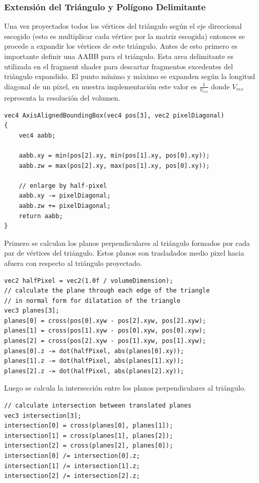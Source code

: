 \subsubsection{Extensión del Triángulo y Polígono Delimitante}
Una vez proyectados todos los vértices del triángulo según el eje direccional escogido (esto es multiplicar cada vértice por la matriz escogida) entonces se procede a expandir los vértices de este triángulo. Antes de esto primero es importante definir una \ac{AABB} para el triángulo. Esta area delimitante es utilizada en el fragment shader para descartar fragmentos excedentes del triángulo expandido. El punto mínimo y máximo se expanden según la longitud diagonal de un pixel, en nuestra implementación este valor es $\frac{1}{V_{res}}$ donde $V_{res}$ representa la resolución del volumen.
\\
\begin{lstlisting}[caption={Creación de un \ac{AABB} para el triángulo proyectado.}, label=AxisAlignedBoundingBox]
vec4 AxisAlignedBoundingBox(vec4 pos[3], vec2 pixelDiagonal)
{
	vec4 aabb;

	aabb.xy = min(pos[2].xy, min(pos[1].xy, pos[0].xy));
	aabb.zw = max(pos[2].xy, max(pos[1].xy, pos[0].xy));

	// enlarge by half-pixel
	aabb.xy -= pixelDiagonal;
	aabb.zw += pixelDiagonal;
	return aabb;
}
\end{lstlisting}

Primero se calculan los planos perpendiculares al triángulo formados por cada par de vértices del triángulo. Estos planos son trasladados medio pixel hacia afuera con respecto al triángulo proyectado.
\\
\begin{lstlisting}[caption={Planos por cada par de vértices del triángulo proyectado.}, label=TPlanes]
vec2 halfPixel = vec2(1.0f / volumeDimension);
// calculate the plane through each edge of the triangle
// in normal form for dilatation of the triangle
vec3 planes[3];
planes[0] = cross(pos[0].xyw - pos[2].xyw, pos[2].xyw);
planes[1] = cross(pos[1].xyw - pos[0].xyw, pos[0].xyw);
planes[2] = cross(pos[2].xyw - pos[1].xyw, pos[1].xyw);
planes[0].z -= dot(halfPixel, abs(planes[0].xy));
planes[1].z -= dot(halfPixel, abs(planes[1].xy));
planes[2].z -= dot(halfPixel, abs(planes[2].xy));
\end{lstlisting}

Luego se calcula la intersección entre los planos perpendiculares al triángulo.
\\
\begin{lstlisting}[caption={Intersección entre planos perpendiculares al triángulo proyectado.}, label=TPlanes2]
// calculate intersection between translated planes
vec3 intersection[3];
intersection[0] = cross(planes[0], planes[1]);
intersection[1] = cross(planes[1], planes[2]);
intersection[2] = cross(planes[2], planes[0]);
intersection[0] /= intersection[0].z;
intersection[1] /= intersection[1].z;
intersection[2] /= intersection[2].z;
\end{lstlisting}

